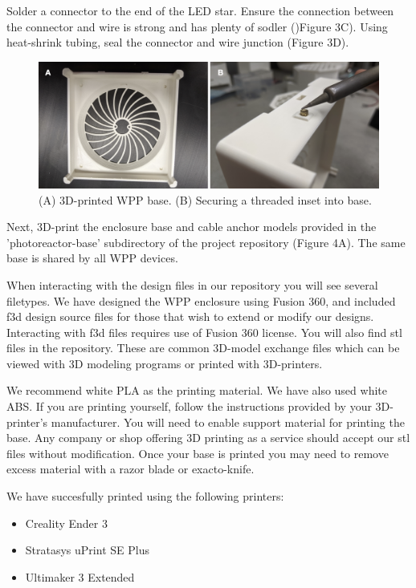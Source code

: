 \documentclass[11pt]{article}
\begin{document}
Solder a connector to the end of the LED star.
Ensure the connection between the connector and wire is strong and has plenty of sodler ()Figure 3C).
Using heat-shrink tubing, seal the connector and wire junction (Figure 3D).

\begin{figure}[H]
	\includegraphics[width=\textwidth]{"./fig4.png"}
	\caption{(A) 3D-printed WPP base. (B) Securing a threaded inset into base.}
\end{figure}

Next, 3D-print the enclosure base and cable anchor models provided in the 'photoreactor-base' subdirectory of the project repository (Figure 4A).
The same base is shared by all WPP devices.

When interacting with the design files in our repository you will see several filetypes.
We have designed the WPP enclosure using Fusion 360, and included f3d design source files for those that wish to extend or modify our designs.
Interacting with f3d files requires use of Fusion 360 license.
You will also find stl files in the repository.
These are common 3D-model exchange files which can be viewed with 3D modeling programs or printed with 3D-printers.

We recommend white PLA as the printing material. We have also used white ABS.
If you are printing yourself, follow the instructions provided by your 3D-printer's manufacturer.
You will need to enable support material for printing the base.
Any company or shop offering 3D printing as a service should accept our stl files without modification.
Once your base is printed you may need to remove excess material with a razor blade or exacto-knife.

We have succesfully printed using the following printers:

\begin{itemize}
	\item Creality Ender 3
	\item Stratasys uPrint SE Plus
	\item Ultimaker 3 Extended
\end{itemize}
\end{document}
